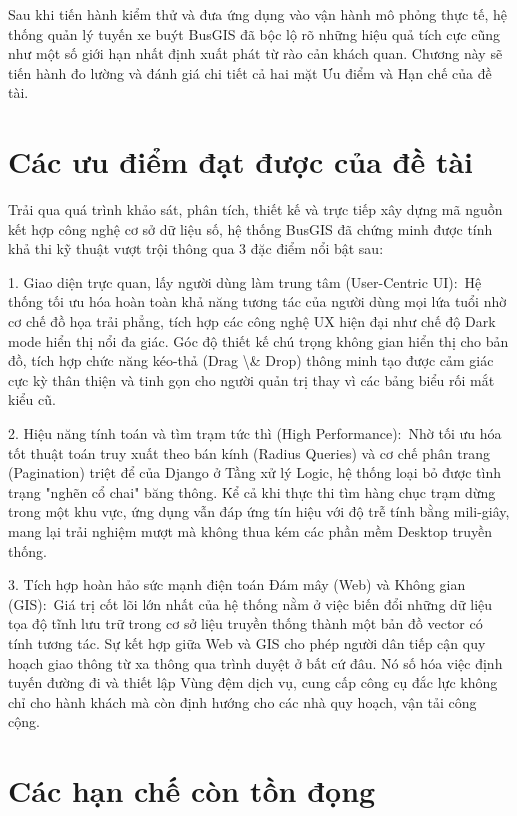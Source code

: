 \documentclass[13pt,a4paper]{report}
\begin{document}
Sau khi tiến hành kiểm thử và đưa ứng dụng vào vận hành mô phỏng thực tế, hệ thống quản lý tuyến xe buýt BusGIS đã bộc lộ rõ những hiệu quả tích cực cũng như một số giới hạn nhất định xuất phát từ rào cản khách quan. Chương này sẽ tiến hành đo lường và đánh giá chi tiết cả hai mặt Ưu điểm và Hạn chế của đề tài.

\section{Các ưu điểm đạt được của đề tài}

Trải qua quá trình khảo sát, phân tích, thiết kế và trực tiếp xây dựng mã nguồn kết hợp công nghệ cơ sở dữ liệu số, hệ thống BusGIS đã chứng minh được tính khả thi kỹ thuật vượt trội thông qua 3 đặc điểm nổi bật sau:

1. Giao diện trực quan, lấy người dùng làm trung tâm (User-Centric UI): Hệ thống tối ưu hóa hoàn toàn khả năng tương tác của người dùng mọi lứa tuổi nhờ cơ chế đồ họa trải phẳng, tích hợp các công nghệ UX hiện đại như chế độ Dark mode hiển thị nổi đa giác. Góc độ thiết kế chú trọng không gian hiển thị cho bản đồ, tích hợp chức năng kéo-thả (Drag \textbackslash{}& Drop) thông minh tạo được cảm giác cực kỳ thân thiện và tinh gọn cho người quản trị thay vì các bảng biểu rối mắt kiểu cũ.

2. Hiệu năng tính toán và tìm trạm tức thì (High Performance): Nhờ tối ưu hóa tốt thuật toán truy xuất theo bán kính (Radius Queries) và cơ chế phân trang (Pagination) triệt để của Django ở Tầng xử lý Logic, hệ thống loại bỏ được tình trạng "nghẽn cổ chai" băng thông. Kể cả khi thực thi tìm hàng chục trạm dừng trong một khu vực, ứng dụng vẫn đáp ứng tín hiệu với độ trễ tính bằng mili-giây, mang lại trải nghiệm mượt mà không thua kém các phần mềm Desktop truyền thống.

3. Tích hợp hoàn hảo sức mạnh điện toán Đám mây (Web) và Không gian (GIS): Giá trị cốt lõi lớn nhất của hệ thống nằm ở việc biến đổi những dữ liệu tọa độ tĩnh lưu trữ trong cơ sở liệu truyền thống thành một bản đồ vector có tính tương tác. Sự kết hợp giữa Web và GIS cho phép người dân tiếp cận quy hoạch giao thông từ xa thông qua trình duyệt ở bất cứ đâu. Nó số hóa việc định tuyến đường đi và thiết lập Vùng đệm dịch vụ, cung cấp công cụ đắc lực không chỉ cho hành khách mà còn định hướng cho các nhà quy hoạch, vận tải công cộng.

\section{Các hạn chế còn tồn đọng}
\end{document}

